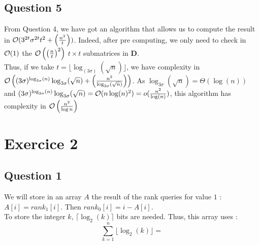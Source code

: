 \documentclass{cours}
\begin{document}
\subsection{Question 5}
From Question 4, we have got an algorithm that allows us to compute the result in $\mathcal{O}{(3^{2t}\sigma^{2t}t^{2} + \left(\frac{n^{2}}{t}\right))}$. Indeed, after pre computing, we only need to check in $\mathcal{O}(1)$ the $\mathcal{O}\left(\left(\frac{n}{t}\right)^{2}\right)$ $t\times t$ submatrices in $\mathbf{D}$.\\
Thus, if we take $t = \lfloor\log_{(3\sigma)}(\sqrt{n})\rfloor$, we have complexity in $\mathcal{O}\left((3\sigma)^{\log_{3\sigma}(n)}\log_{3\sigma}(\sqrt{n}) + \left(\frac{n^{2}}{\log_{3\sigma}(\sqrt{n})}\right)\right)$. As $\log_{3\sigma}(\sqrt{n}) = \Theta(\log(n))$ and $(3\sigma)^{\log_{3\sigma}(n)}\log_{3\sigma}(\sqrt{n}) = \mathcal{O}(n \log(n)^{2}) = o(\frac{n^{2}}{\log(n)})$, this algorithm has complexity in $\mathcal{O}\left(\frac{n^{2}}{\log{n}}\right)$

\section{Exercice 2}

\subsection{Question 1}
We will store in an array $A$ the result of the rank queries for value $1$ : $A[i] = rank_{1}[i]$. Then $rank_{0}[i] = i - A[i]$.\\
To store the integer $k$, $\lceil \log_{2}(k) \rceil$ bits are needed. Thus, this array uses : 
\[
    \sum_{k = 1}^{n} \lfloor\log_{2}(k)\rfloor = 
\]
\end{document}
